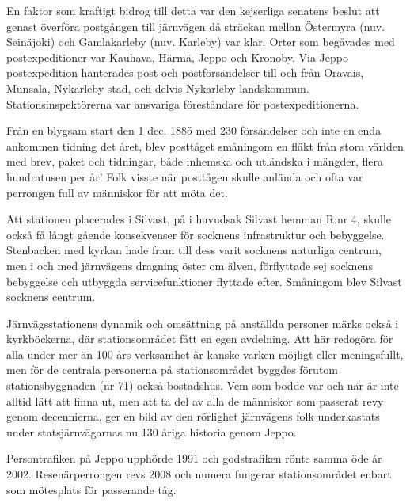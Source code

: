 En faktor som kraftigt bidrog till detta var den kejserliga senatens beslut att genast överföra postgången till järnvägen då sträckan mellan Östermyra (nuv. Seinäjoki) och Gamlakarleby (nuv. Karleby) var  klar. Orter som begåvades med postexpeditioner var Kauhava, Härmä, Jeppo och Kronoby. Via Jeppo postexpedition hanterades post och postförsändelser till och från Oravais, Munsala, Nykarleby stad, och delvis Nykarleby landskommun. Stationsinspektörerna var ansvariga föreståndare för postexpeditionerna.

Från en blygsam start den 1 dec. 1885 med 230 försändelser och inte en enda ankommen tidning det året, blev posttåget småningom en fläkt från stora världen med brev, paket och tidningar, både inhemska och utländska i mängder, flera hundratusen per år! Folk visste när posttågen skulle anlända och ofta var perrongen full av människor för att möta det.

Att stationen placerades i Silvast, på i huvudsak Silvast hemman R:nr 4, skulle också få långt gående konsekvenser för socknens infrastruktur och bebyggelse. Stenbacken med kyrkan hade fram till dess varit socknens naturliga centrum, men i och med järnvägens dragning öster om älven, förflyttade sej socknens bebyggelse och utbyggda servicefunktioner flyttade efter. Småningom blev Silvast socknens centrum.

Järnvägsstationens dynamik och omsättning på anställda personer märks också i kyrkböckerna, där stationsområdet fått en egen avdelning. Att här redogöra för alla under mer än 100 års verksamhet är kanske varken möjligt eller meningsfullt, men för de centrala personerna på stationsområdet byggdes förutom stationsbyggnaden (nr 71) också bostadshus. Vem som bodde var och när är inte alltid lätt att finna ut, men att ta del av alla de människor som passerat revy genom decennierna, ger en bild av den rörlighet järnvägens folk underkastats under statsjärnvägarnas nu 130 åriga historia genom Jeppo.

Persontrafiken på Jeppo upphörde 1991 och godstrafiken rönte samma öde år 2002. Resenärperrongen revs 2008 och numera fungerar stationsområdet enbart som mötesplats för passerande tåg.


